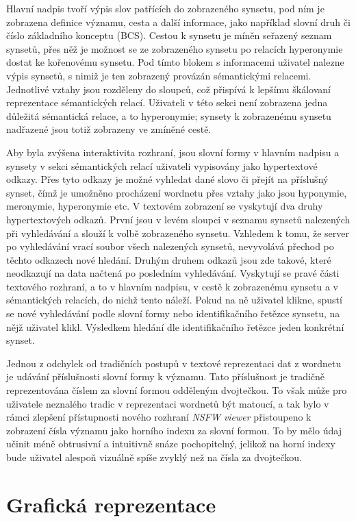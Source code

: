 \documentclass[a4paper, 11pt, oneside]{book}
\newcommand{\simplywn}{\textit{NSFW viewer} }
\begin{document}
				Hlavní nadpis tvoří výpis slov patřících do zobrazeného synsetu, pod ním je zobrazena definice významu, cesta a další informace, jako například slovní druh či číslo základního konceptu (BCS). Cestou k synsetu je míněn seřazený seznam synsetů, přes něž je možnost se ze zobrazeného synsetu po relacích hyperonymie dostat ke kořenovému synsetu. Pod tímto blokem s informacemi uživatel nalezne výpis synsetů, s nimiž je ten zobrazený provázán sémantickými relacemi. Jednotlivé vztahy jsou rozděleny do sloupců, což přispívá k lepšímu škálovaní reprezentace sémantických relací. Uživateli v této sekci není zobrazena jedna důležitá sémantická relace, a to hyperonymie; synsety k zobrazenému synsetu nadřazené jsou totiž zobrazeny ve zmíněné cestě.

				Aby byla zvýšena interaktivita rozhraní, jsou slovní formy v hlavním nadpisu a synsety v sekci sémantických relací uživateli vypisovány jako hypertextové odkazy. Přes tyto odkazy je možné vyhledat dané slovo či přejít na příslušný synset, čímž je umožněno procházení wordnetu přes vztahy jako jsou hyponymie, meronymie, hyperonymie etc. V textovém zobrazení se vyskytují dva druhy hypertextových odkazů. První jsou v levém sloupci v seznamu synsetů nalezených při vyhledávání a slouží k volbě zobrazeného synsetu. Vzhledem k tomu, že server po vyhledávání vrací soubor všech nalezených synsetů, nevyvolává přechod po těchto odkazech nové hledání. Druhým druhem odkazů jsou zde takové, které neodkazují na data načtená po posledním vyhledávání. Vyskytují se pravé části textového rozhraní, a to v hlavním nadpisu, v cestě k zobrazenému synsetu a v sémantických relacích, do nichž tento náleží. Pokud na ně uživatel klikne, spustí se nové vyhledávání podle slovní formy nebo identifikačního řetězce synsetu, na nějž uživatel klikl. Výsledkem hledání dle identifikačního řetězce jeden konkrétní synset.

				Jednou z odchylek od tradičních postupů v textové reprezentaci dat z wordnetu je udávání příslušnosti slovní formy k významu. Tato příslušnost je tradičně reprezentována číslem za slovní formou odděleným dvojtečkou. To však může pro uživatele neznalého tradic v reprezentaci wordnetů být matoucí, a tak bylo v rámci zlepšení přístupnosti nového rozhraní \simplywn přistoupeno k zobrazení čísla významu jako horního indexu za slovní formou. To by mělo údaj učinit méně obtrusivní a intuitivně snáze pochopitelný, jelikož na horní indexy bude uživatel alespoň vizuálně spíše zvyklý než na čísla za dvojtečkou.

			\section{Grafická reprezentace}
\end{document}

